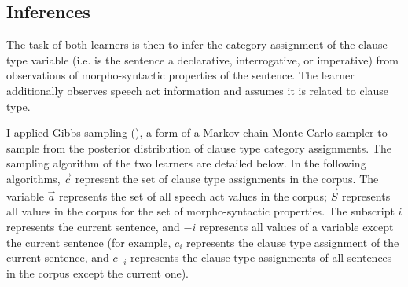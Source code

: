 \subsection{Inferences}
\label{sec:engcl:model:infer}

The task of both learners is then to infer the category assignment of the clause type variable (i.e. is the sentence a declarative, interrogative, or imperative) from observations of morpho-syntactic properties of the sentence. The \plearnerabbr{} learner additionally observes speech act information and assumes it is related to clause type. 

I applied Gibbs sampling (\cite{geman1984gibbs}), a form of a Markov chain Monte Carlo sampler to sample from the posterior distribution of clause type category assignments. The sampling algorithm of the two learners are detailed below. In the following algorithms, $\vec{c}$ represent the set of clause type assignments in the corpus. The variable $\vec{a}$ represents the set of all speech act values in the corpus; $\vec{S}$ represents all values in the corpus for the set of morpho-syntactic properties. The subscript $i$ represents the current sentence, and $-i$ represents all values of a variable except the current sentence (for example, $c_{i}$ represents the clause type assignment of the current sentence, and $c_{-i}$ represents the clause type assignments of all sentences in the corpus except the current one).

